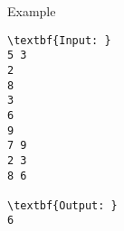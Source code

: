 Example
\begin{verbatim}
\textbf{Input: }
5 3
2
8
3
6
9
7 9
2 3
8 6

\textbf{Output: }
6\end{verbatim}